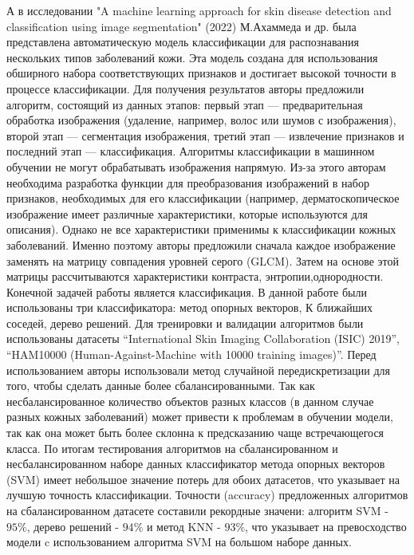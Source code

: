 \documentclass[14pt, a4paper]{extarticle}
\begin{document}
А в исследовании "A machine learning approach for skin disease detection
and classification using image segmentation" (2022) М.Ахаммеда и др. \cite{ahammed2022machine}  была представлена  автоматическую модель классификации для распознавания нескольких типов  заболеваний кожи. Эта модель создана для использования обширного набора соответствующих признаков и достигает высокой точности в процессе классификации. 
Для получения результатов авторы предложили алгоритм, состоящий из данных этапов:
 первый этап — предварительная обработка изображения (удаление, например, волос или шумов с изображения), второй этап — сегментация изображения, третий этап — извлечение признаков и последний этап — классификация. Алгоритмы классификации в машинном обучении не могут обрабатывать изображения напрямую. Из-за этого  авторам необходима разработка функции для преобразования изображений в набор признаков, необходимых для его классификации (например, дерматоскопическое изображение имеет различные характеристики, которые используются для описания). Однако не все характеристики применимы к классификации кожных заболеваний. Именно поэтому авторы предложили сначала каждое изображение заменять на матрицу совпадения уровней серого (GLCM). Затем на основе этой матрицы рассчитываются характеристики контраста, энтропии,однородности. Конечной задачей работы является классификация. В данной работе были использованы три классификатора: метод опорных векторов, К ближайших соседей, дерево решений.
 Для тренировки и валидации алгоритмов были использованы датасеты “International Skin Imaging Collaboration (ISIC) 2019”,  “HAM10000 (Human-Against-Machine with 10000 training images)”.
 Перед использованием авторы использовали метод случайной передискретизации для того, чтобы сделать  данные более сбалансированными. Так как несбалансированное количество объектов разных классов (в данном случае разных кожных заболеваний) может привести к проблемам в обучении модели, так как она может быть более склонна к предсказанию чаще встречающегося класса. 
По итогам тестирования алгоритмов на сбалансированном и несбалансированном наборе данных классификатор метода опорных векторов (SVM) имеет небольшое значение потерь для обоих датасетов, что указывает на лучшую точность классификации. Точности (accuracy) предложенных алгоритмов на сбалансированном датасете составили рекордные значени: алгоритм SVM - $95\%$,  дерево решений  - $94\%$ и метод KNN - $93\%$, что указывает на превосходство модели c использованием алгоритма SVM на большом наборе данных. 
\end{document}
